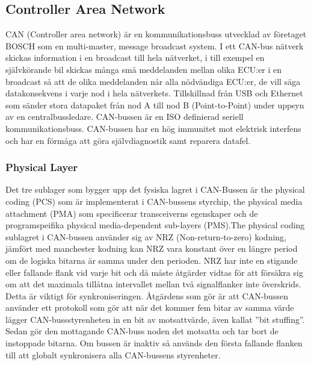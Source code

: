 \documentclass[a4paper]{IEEEtran}
\begin{document}
\subsection{Controller Area Network} \label{sec:CAN}
CAN (Controller area network) är en kommunikationsbuss utvecklad av företaget BOSCH som en multi-master, message broadcast system. I ett CAN-bus nätverk skickas information i en broadcast till hela nätverket, i till exempel en självkörande bil skickas många små meddelanden mellan olika ECU:er i en broadcast så att de olika meddelanden når alla nödvändiga ECU:er, de vill säga datakonsekvens i varje nod i hela nätverkets. Tillskillnad från USB och Ethernet som sänder stora datapaket från nod A till nod B (Point-to-Point) under uppsyn av en centralbussledare. CAN-bussen är en ISO definierad seriell kommunikationsbuss. CAN-bussen har en hög immunitet mot elektrisk interfens och har en förmåga att göra självdiagnostik samt reparera datafel. \cite{CANintr}

\subsubsection{Physical Layer}
Det tre sublager som bygger upp det fysiska lagret i CAN-Bussen är the physical coding (PCS) som är implementerat i CAN-bussens styrchip, the physical media attachment (PMA) som specificerar transceiverns egenskaper och de programspeifika physical media-dependent sub-layers (PMS).The physical coding sublagret i CAN-bussen använder sig av NRZ (Non-return-to-zero) kodning, jämfört med manchester kodning kan NRZ vara konstant över en längre period om de logiska bitarna är samma under den perioden. NRZ har inte en stigande eller fallande flank vid varje bit och då måste åtgärder vidtas för att försäkra sig om att det maximala tillåtna intervallet mellan två signalflanker inte överskrids. Detta är viktigt för synkroniseringen. Åtgärdens som gör är att CAN-bussen använder ett protokoll som gör att när det kommer fem bitar av samma värde lägger CAN-bussstyrenheten in en bit av motsattvärde, även kallat ”bit stuffing”. Sedan gör den mottagande CAN-buss noden det motsatta och tar bort de instoppade bitarna. Om bussen är inaktiv så används den första fallande flanken till att globalt synkronisera alla CAN-bussens styrenheter. \cite{CANphys}
\end{document}
